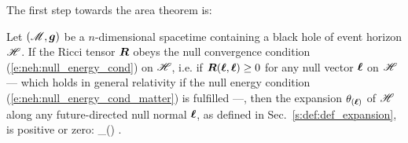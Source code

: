 The first step towards the area theorem is:

\begin{prop}
\label{p:evo:positive_expansion}
Let $(\mathscr{M},\bm{g})$ be a $n$-dimensional spacetime containing a black hole
of event horizon $\mathscr{H}$. If the Ricci tensor $\bm{R}$ obeys the null
convergence condition (\ref{e:neh:null_energy_cond}) on $\mathscr{H}$, i.e. if
$\bm{R}(\bm{\ell}, \bm{\ell}) \geq 0$ for any null vector $\bm{\ell}$ on $\mathscr{H}$
--- which holds in general relativity if the null energy condition (\ref{e:neh:null_energy_cond_matter}) is fulfilled ---, then the
expansion $\theta_{(\bm{\ell})}$ of $\mathscr{H}$ along any future-directed null
normal $\bm{\ell}$, as defined in Sec.~\ref{s:def:def_expansion}, is positive or zero:
\be \label{e:evo:theta_positive}
    \theta_{(\wl)}  .
\ee
\end{prop}

